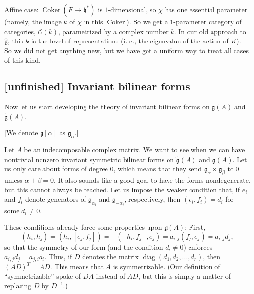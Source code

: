 \documentclass[etingof-lie.tex]{subfiles}
\begin{document}
Affine case: $\operatorname*{Coker}\left(  F\rightarrow\mathfrak{h}^{\ast
}\right)  $ is $1$-dimensional, so $\chi$ has one essential parameter (namely,
the image $k$ of $\chi$ in this $\operatorname*{Coker}$). So we get a
$1$-parameter category of categories, $\mathcal{O}\left(  k\right)  $,
parametrized by a complex number $k$. In our old approach to
$\widehat{\mathfrak{g}}$, this $k$ is the level of representations (i. e., the
eigenvalue of the action of $K$). So we did not get anything new, but we have
got a uniform way to treat all cases of this kind.

\subsection{\textbf{[unfinished]} Invariant bilinear forms}

Now let us start developing the theory of invariant bilinear forms on
$\mathfrak{g}\left(  A\right)  $ and $\widetilde{\mathfrak{g}}\left(
A\right)  $.

[We denote $\mathfrak{g}\left[  \alpha\right]  $ as $\mathfrak{g}_{\alpha}$.]

Let $A$ be an indecomposable complex matrix. We want to see when we can have
nontrivial nonzero invariant symmetric bilinear forms on
$\widetilde{\mathfrak{g}}\left(  A\right)  $ and $\mathfrak{g}\left(
A\right)  $. Let us only care about forms of degree $0$, which means that they
send $\mathfrak{g}_{\alpha}\times\mathfrak{g}_{\beta}$ to $0$ unless
$\alpha+\beta=0$. It also sounds like a good goal to have the forms
nondegenerate, but this cannot always be reached. Let us impose the weaker
condition that, if $e_{i}$ and $f_{i}$ denote generators of $\mathfrak{g}%
_{\alpha_{i}}$ and $\mathfrak{g}_{-\alpha_{i}}$, respectively, then $\left(
e_{i},f_{i}\right)  =d_{i}$ for some $d_{i}\neq0$.

These conditions already force some properties upon $\mathfrak{g}\left(
A\right)  $: First,
\[
\left(  h_{i},h_{j}\right)  =\left(  h_{i},\left[  e_{j},f_{j}\right]
\right)  =-\left(  \left[  h_{i},f_{j}\right]  ,e_{j}\right)  =a_{i,j}\left(
f_{j},e_{j}\right)  =a_{i,j}d_{j},
\]
so that the symmetry of our form (and the condition $d_{i}\neq0$) enforces
$a_{i,j}d_{j}=a_{j,i}d_{i}$. Thus, if $D$ denotes the matrix
$\operatorname*{diag}\left(  d_{1},d_{2},...,d_{r}\right)  $, then $\left(
AD\right)  ^{T}=AD$. This means that $A$ is symmetrizable. (Our definition of
``symmetrizable'' spoke of $DA$ instead of $AD$, but this is simply a matter
of replacing $D$ by $D^{-1}$.)
\end{document}
